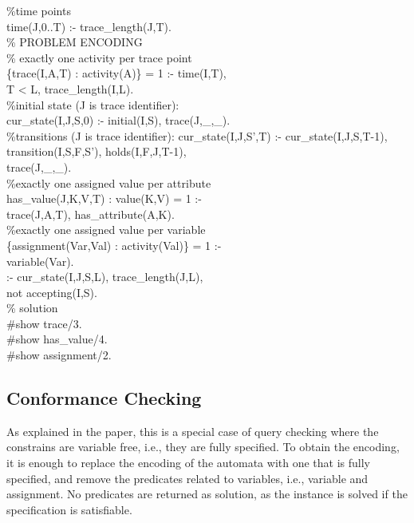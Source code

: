 \begin{small}
\begin{aspcode}
\noindent
\%time points\\
time(J,0..T) :- trace\_length(J,T).\\

\noindent
\% PROBLEM ENCODING\\

\noindent
\% exactly one activity per trace point\\
\{trace(I,A,T) : activity(A)\} = 1 :- time(I,T),\\
T < L, trace\_length(I,L).\\

\noindent
\%initial state (J is trace identifier):\\
cur\_state(I,J,S,0) :- initial(I,S), trace(J,\_,\_).\\

\noindent
\%transitions (J is trace identifier):
cur\_state(I,J,S',T) :- cur\_state(I,J,S,T-1),\\
\phantom{cur\_state}transition(I,S,F,S'), holds(I,F,J,T-1),\\
\phantom{cur\_state}trace(J,\_,\_).\\

\noindent
\%exactly one assigned value per attribute\\
{has\_value(J,K,V,T) : value(K,V)} = 1 :- \\
\phantom{has\_value}trace(J,A,T), has\_attribute(A,K).\\

\noindent
\%exactly one assigned value per variable\\
\{assignment(Var,Val) : activity(Val)\} = 1 :- \\
variable(Var).\\

\noindent
:- cur\_state(I,J,S,L), trace\_length(J,L),\\
\phantom{:- }not accepting(I,S).\\

\noindent
\% solution\\
\#show trace/3.\\
\#show has\_value/4.\\
\#show assignment/2.
\end{aspcode}
\end{small}

\subsection{Conformance Checking}
As explained in the paper, this is a special case of query checking where 
the constrains are variable free, i.e., they are fully specified. 
To obtain the encoding, it is enough to replace the encoding of the automata 
with one that is fully specified, and remove the predicates related to variables, 
i.e., {\asp variable} and {\asp assignment}.
No predicates are returned as solution, as the instance is solved if the 
specification is satisfiable.

